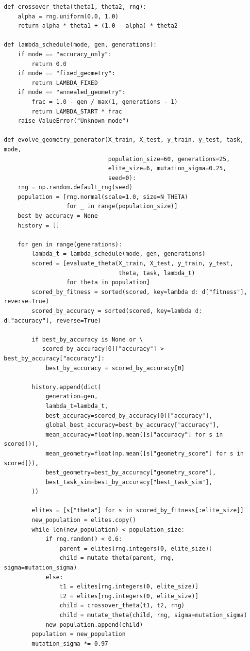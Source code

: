 \documentclass[11pt,a4paper]{report}
\begin{document}
\begin{lstlisting}[style=python,caption={Unified Python code for Meta-SBOHN v5/v6 tests.}]
def crossover_theta(theta1, theta2, rng):
    alpha = rng.uniform(0.0, 1.0)
    return alpha * theta1 + (1.0 - alpha) * theta2

def lambda_schedule(mode, gen, generations):
    if mode == "accuracy_only":
        return 0.0
    if mode == "fixed_geometry":
        return LAMBDA_FIXED
    if mode == "annealed_geometry":
        frac = 1.0 - gen / max(1, generations - 1)
        return LAMBDA_START * frac
    raise ValueError("Unknown mode")

def evolve_geometry_generator(X_train, X_test, y_train, y_test, task, mode,
                              population_size=60, generations=25,
                              elite_size=6, mutation_sigma=0.25,
                              seed=0):
    rng = np.random.default_rng(seed)
    population = [rng.normal(scale=1.0, size=N_THETA)
                  for _ in range(population_size)]
    best_by_accuracy = None
    history = []

    for gen in range(generations):
        lambda_t = lambda_schedule(mode, gen, generations)
        scored = [evaluate_theta(X_train, X_test, y_train, y_test,
                                 theta, task, lambda_t)
                  for theta in population]
        scored_by_fitness = sorted(scored, key=lambda d: d["fitness"], reverse=True)
        scored_by_accuracy = sorted(scored, key=lambda d: d["accuracy"], reverse=True)

        if best_by_accuracy is None or \
           scored_by_accuracy[0]["accuracy"] > best_by_accuracy["accuracy"]:
            best_by_accuracy = scored_by_accuracy[0]

        history.append(dict(
            generation=gen,
            lambda_t=lambda_t,
            best_accuracy=scored_by_accuracy[0]["accuracy"],
            global_best_accuracy=best_by_accuracy["accuracy"],
            mean_accuracy=float(np.mean([s["accuracy"] for s in scored])),
            mean_geometry=float(np.mean([s["geometry_score"] for s in scored])),
            best_geometry=best_by_accuracy["geometry_score"],
            best_task_sim=best_by_accuracy["best_task_sim"],
        ))

        elites = [s["theta"] for s in scored_by_fitness[:elite_size]]
        new_population = elites.copy()
        while len(new_population) < population_size:
            if rng.random() < 0.6:
                parent = elites[rng.integers(0, elite_size)]
                child = mutate_theta(parent, rng, sigma=mutation_sigma)
            else:
                t1 = elites[rng.integers(0, elite_size)]
                t2 = elites[rng.integers(0, elite_size)]
                child = crossover_theta(t1, t2, rng)
                child = mutate_theta(child, rng, sigma=mutation_sigma)
            new_population.append(child)
        population = new_population
        mutation_sigma *= 0.97


\end{lstlisting}
\end{document}
